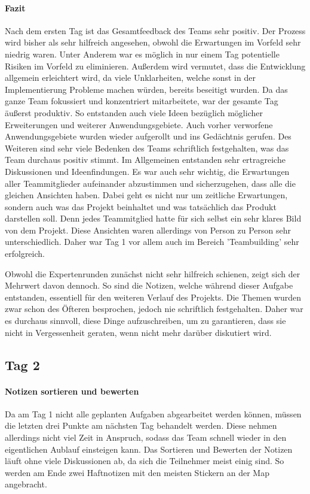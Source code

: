 \paragraph{Fazit}
Nach dem ersten Tag ist das Gesamtfeedback des Teams sehr positiv. Der Prozess wird bisher als sehr hilfreich angesehen, obwohl die Erwartungen im Vorfeld sehr niedrig waren. Unter Anderem war es möglich in nur einem Tag potentielle Risiken im Vorfeld zu eliminieren. Außerdem wird vermutet, dass die Entwicklung allgemein erleichtert wird, da viele Unklarheiten, welche sonst in der Implementierung Probleme machen würden, bereits beseitigt wurden. Da das ganze Team fokussiert und konzentriert mitarbeitete, war der gesamte Tag äußerst produktiv. So entstanden auch viele Ideen bezüglich möglicher Erweiterungen und weiterer Anwendungsgebiete. Auch vorher verworfene Anwendungsgebiete wurden wieder aufgerollt und ins Gedächtnis gerufen. Des Weiteren sind sehr viele Bedenken des Teams schriftlich festgehalten, was das Team durchaus positiv stimmt. Im Allgemeinen entstanden sehr ertragreiche Diskussionen und Ideenfindungen. Es war auch sehr wichtig, die Erwartungen aller Teammitglieder aufeinander abzustimmen und sicherzugehen, dass alle die gleichen Ansichten haben. Dabei geht es nicht nur um zeitliche Erwartungen, sondern auch was das Projekt beinhaltet und was tatsächlich das Produkt darstellen soll. Denn jedes Teammitglied hatte für sich selbst ein sehr klares Bild von dem Projekt. Diese Ansichten waren allerdings von Person zu Person sehr unterschiedlich. Daher war Tag 1 vor allem auch im Bereich 'Teambuilding' sehr erfolgreich.

Obwohl die Expertenrunden zunächst nicht sehr hilfreich schienen, zeigt sich der Mehrwert davon dennoch. So sind die Notizen, welche während dieser Aufgabe entstanden, essentiell für den weiteren Verlauf des Projekts. Die Themen wurden zwar schon des Öfteren besprochen, jedoch nie schriftlich festgehalten. Daher war es durchaus sinnvoll, diese Dinge aufzuschreiben, um zu garantieren, dass sie nicht in Vergessenheit geraten, wenn nicht mehr darüber diskutiert wird.

\subsection*{Tag 2}
\paragraph{Notizen sortieren und bewerten}
Da am Tag 1 nicht alle geplanten Aufgaben abgearbeitet werden können, müssen die letzten drei Punkte am nächsten Tag behandelt werden. Diese nehmen allerdings nicht viel Zeit in Anspruch, sodass das Team schnell wieder in den eigentlichen Aublauf einsteigen kann. Das Sortieren und Bewerten der Notizen läuft ohne viele Diskussionen ab, da sich die Teilnehmer meist einig sind. So werden am Ende zwei Haftnotizen mit den meisten Stickern an der Map angebracht.

